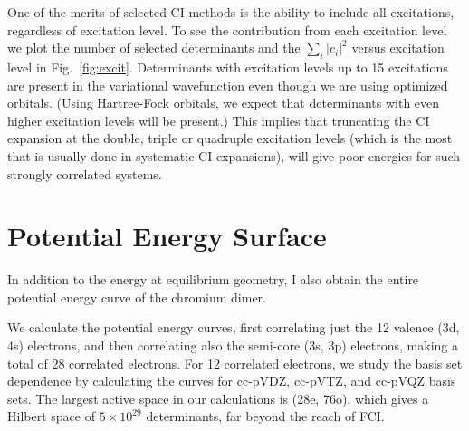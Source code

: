 One of the merits of selected-CI methods is the ability to include all excitations, regardless of excitation level.
To see the contribution from each excitation level we plot the number of selected determinants and the $\sum_i \left|c_i\right|^2$ versus excitation level in Fig.~\ref{fig:excit}.
Determinants with excitation levels up to 15 excitations are present in the variational wavefunction even though we are using optimized orbitals.
(Using Hartree-Fock orbitals, we expect that determinants with even higher excitation levels will be present.)
This implies that truncating the CI expansion at the double, triple or quadruple excitation levels (which is the most that is usually done in systematic
CI expansions), will give poor energies for such strongly correlated systems.

\section{Potential Energy Surface}
In addition to the energy at equilibrium geometry, I also obtain the entire potential energy curve of the chromium dimer.

We calculate the potential energy curves, first correlating just the 12 valence (3d, 4s) electrons, and then correlating
also the semi-core (3s,
3p) electrons, making a total of 28 correlated electrons.
For 12 correlated electrons, we study the basis set dependence by calculating the curves for cc-pVDZ, cc-pVTZ, and cc-pVQZ basis sets.
The largest active space in our calculations is (28e, 76o), which gives a Hilbert space of $5\times10^{29}$ determinants, far beyond the reach of FCI.


